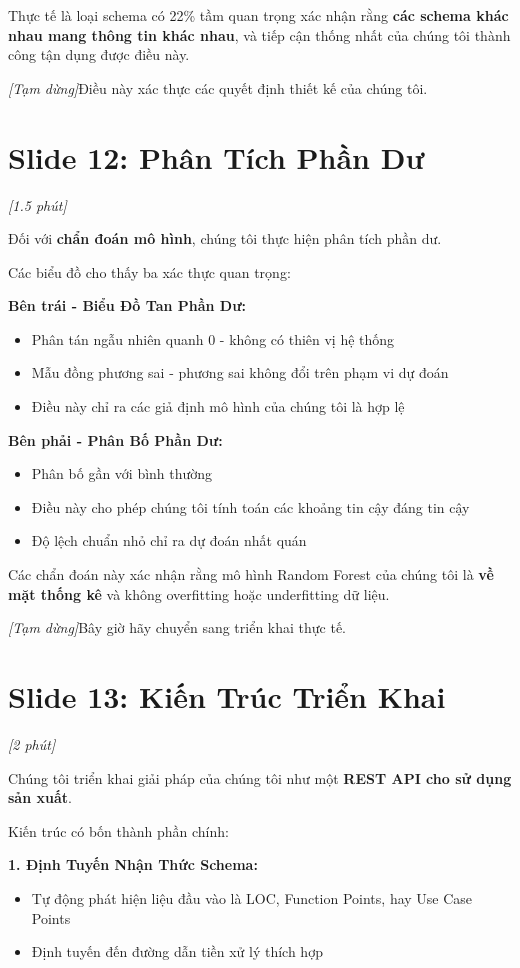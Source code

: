 \documentclass[12pt,a4paper]{article}
\newcommand{\slide}[1]{\section*{\textcolor{slidenum}{Slide #1}}}
\newcommand{\timing}[1]{\textcolor{timing}{\textit{[#1]}}}
\newcommand{\keypoint}[1]{\textcolor{keypoint}{\textbf{#1}}}
\newcommand{\pause}{\textit{[Tạm dừng]}}
\begin{document}
Thực tế là loại schema có 22\% tầm quan trọng xác nhận rằng \textbf{các schema khác nhau mang thông tin khác nhau}, và tiếp cận thống nhất của chúng tôi thành công tận dụng được điều này.

\pause Điều này xác thực các quyết định thiết kế của chúng tôi.

\slide{12: Phân Tích Phần Dư}
\timing{1.5 phút}

Đối với \keypoint{chẩn đoán mô hình}, chúng tôi thực hiện phân tích phần dư.

Các biểu đồ cho thấy ba xác thực quan trọng:

\textbf{Bên trái - Biểu Đồ Tan Phần Dư:}
\begin{itemize}
    \item Phân tán ngẫu nhiên quanh 0 - không có thiên vị hệ thống
    \item Mẫu đồng phương sai - phương sai không đổi trên phạm vi dự đoán
    \item Điều này chỉ ra các giả định mô hình của chúng tôi là hợp lệ
\end{itemize}

\textbf{Bên phải - Phân Bố Phần Dư:}
\begin{itemize}
    \item Phân bố gần với bình thường
    \item Điều này cho phép chúng tôi tính toán các khoảng tin cậy đáng tin cậy
    \item Độ lệch chuẩn nhỏ chỉ ra dự đoán nhất quán
\end{itemize}

Các chẩn đoán này xác nhận rằng mô hình Random Forest của chúng tôi là \textbf{về mặt thống kê}  và không overfitting hoặc underfitting dữ liệu.

\pause Bây giờ hãy chuyển sang triển khai thực tế.

\slide{13: Kiến Trúc Triển Khai}
\timing{2 phút}

Chúng tôi triển khai giải pháp của chúng tôi như một \keypoint{REST API cho sử dụng sản xuất}.

Kiến trúc có bốn thành phần chính:

\textbf{1. Định Tuyến Nhận Thức Schema:}
\begin{itemize}
    \item Tự động phát hiện liệu đầu vào là LOC, Function Points, hay Use Case Points
    \item Định tuyến đến đường dẫn tiền xử lý thích hợp
\end{itemize}
\end{document}
